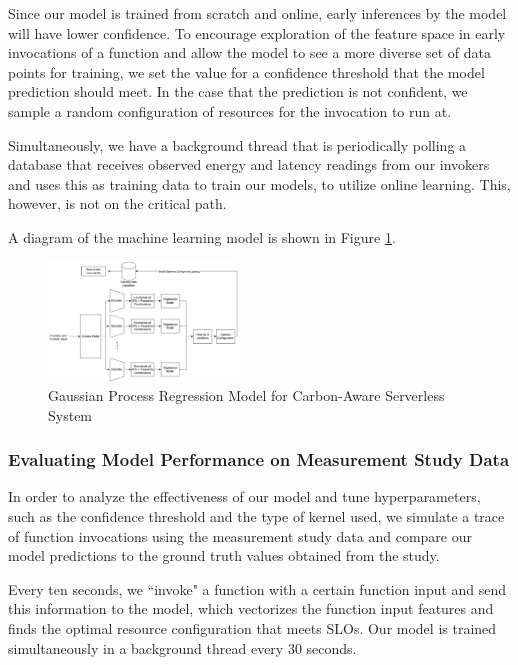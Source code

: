 \documentclass[times, 10pt,twocolumn]{article}
\begin{document}
Since our model is trained from scratch and online, early inferences by the model will have lower confidence. To encourage exploration of the feature space in early invocations of a function and allow the model to see a more diverse set of data points for training, we set the value for a confidence threshold that the model prediction should meet. In the case that the prediction is not confident, we sample a random configuration of resources for the invocation to run at. 

Simultaneously, we have a background thread that is periodically polling a database that receives observed energy and latency readings from our invokers and uses this as training data to train our models, to utilize online learning. This, however, is not on the critical path.



A diagram of the machine learning model is shown in Figure \ref{fig:ml_model}.

\begin{figure}[ht]
   \centering
   \includegraphics[width=0.45\textwidth]{imgs/ml_model.png}
   \caption{Gaussian Process Regression Model for Carbon-Aware Serverless System}
   \label{fig:ml_model}
 \end{figure}

 \subsubsection{Evaluating Model Performance on Measurement Study Data}
In order to analyze the effectiveness of our model and tune hyperparameters, such as the confidence threshold and the type of kernel used, we simulate a trace of function invocations using the measurement study data and compare our model predictions to the ground truth values obtained from the study.

Every ten seconds, we ``invoke" a function with a certain function input and send this information to the model, which vectorizes the function input features and finds the optimal resource configuration that meets SLOs. Our model is trained simultaneously in a background thread every 30 seconds. 
 
\end{document}
